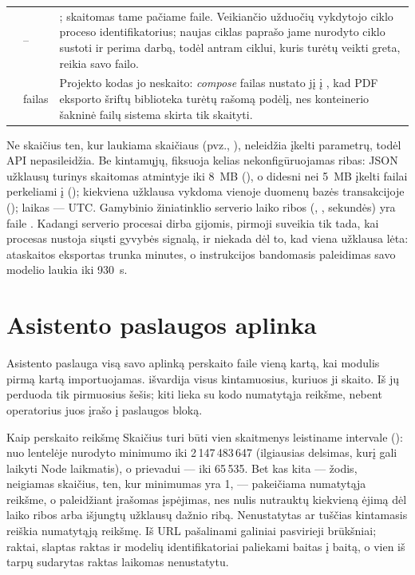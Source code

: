 \begin{xltabular}{\textwidth}{@{}L{40mm}L{21mm}Y@{}}
 & -- & ; skaitomas tame pačiame faile. Veikiančio užduočių vykdytojo ciklo proceso identifikatorius; naujas ciklas paprašo jame nurodyto ciklo sustoti ir perima darbą, todėl antram ciklui, kuris turėtų veikti greta, reikia savo failo. \\
 & failas & Projekto kodas jo neskaito: \textit{compose} failas nustato jį į , kad PDF eksporto šriftų biblioteka turėtų rašomą podėlį, nes konteinerio šakninė failų sistema skirta tik skaityti. \\
\end{xltabular}

Ne skaičius ten, kur laukiama skaičiaus (pvz., ), neleidžia įkelti
parametrų, todėl API nepasileidžia. Be kintamųjų,  fiksuoja kelias
nekonfigūruojamas ribas: JSON užklausų turinys skaitomas atmintyje iki 8~MB
(), o didesni nei 5~MB įkelti failai perkeliami į
 (); kiekviena užklausa vykdoma vienoje duomenų
bazės transakcijoje (); laikas --- UTC. Gamybinio žiniatinklio serverio
laiko ribos (, , 
sekundės) yra faile . Kadangi serverio procesai dirba gijomis,
pirmoji suveikia tik tada, kai procesas nustoja siųsti gyvybės signalą, ir niekada dėl to, kad
viena užklausa lėta: ataskaitos eksportas trunka minutes, o instrukcijos bandomasis paleidimas
savo modelio laukia iki 930~s.


\section{Asistento paslaugos aplinka}\label{sec:config:assistant}

Asistento paslauga visą savo aplinką perskaito faile  vieną kartą, kai modulis
pirmą kartą importuojamas.  išvardija visus kintamuosius, kuriuos ji
skaito. Iš jų  perduoda tik pirmuosius šešis; kiti lieka su kodo
numatytąja reikšme, nebent operatorius juos įrašo į paslaugos  bloką.

\begin{codebox}{Kaip  perskaito reikšmę}
Skaičius turi būti vien skaitmenys leistiname intervale (): nuo lentelėje
nurodyto minimumo iki 2\,147\,483\,647 (ilgiausias delsimas, kurį gali laikyti Node laikmatis),
o prievadui --- iki 65\,535. Bet kas kita --- žodis, neigiamas skaičius,  ten, kur
minimumas yra 1, --- pakeičiama numatytąja reikšme, o paleidžiant įrašomas įspėjimas, nes nulis
nutrauktų kiekvieną ėjimą dėl laiko ribos arba išjungtų užklausų dažnio ribą. Nenustatytas ar
tuščias kintamasis reiškia numatytąją reikšmę. Iš URL pašalinami galiniai pasvirieji brūkšniai;
raktai, slaptas raktas ir modelių identifikatoriai paliekami baitas į baitą, o vien iš tarpų
sudarytas raktas laikomas nenustatytu.
\end{codebox}

